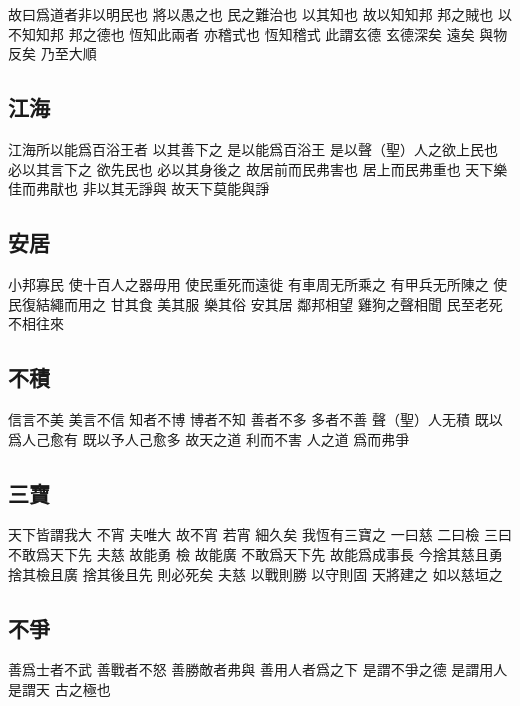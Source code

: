 \documentclass[a5paper,zihao=-4,oneside,UTF8]{ctexart}
\begin{document}
故曰爲道者非以明民也 將以愚之也 民之難治也 以其知也 
故以知知邦 邦之賊也 以不知知邦 邦之德也 
恆知此兩者 亦稽式也 恆知稽式 此謂玄德 
玄德深矣 遠矣 與物反矣 乃至大順 



\subsection{江海}



江海所以能爲百浴王者 以其善下之 是以能爲百浴王 
是以聲（聖）人之欲上民也 必以其言下之 欲先民也 必以其身後之 故居前而民弗害也 居上而民弗重也 天下樂佳而弗猒也 非以其无諍與 故天下莫能與諍 



\subsection{安居}



小邦寡民 
使十百人之器毋用 使民重死而遠徙 有車周无所乘之 有甲兵无所陳之 使民復結繩而用之 
甘其食 美其服 樂其俗 安其居 
鄰邦相望 雞狗之聲相聞 民至老死 不相往來 



\subsection{不積}



信言不美 美言不信 
知者不博 博者不知 
善者不多 多者不善 
聲（聖）人无積 既以爲人己愈有 既以予人己愈多 
故天之道 利而不害 人之道 爲而弗爭 



\subsection{三寶}



天下皆謂我大 不宵 夫唯大 故不宵 若宵 細久矣 
我恆有三寶之 一曰慈 二曰檢 三曰不敢爲天下先 
夫慈 故能勇 檢 故能廣 不敢爲天下先 故能爲成事長 
今捨其慈且勇 捨其檢且廣 捨其後且先 則必死矣 
夫慈 以戰則勝 以守則固 
天將建之 如以慈垣之 



\subsection{不爭}



善爲士者不武 善戰者不怒 善勝敵者弗與 善用人者爲之下 
是謂不爭之德 是謂用人 是謂天 古之極也 
\end{document}
